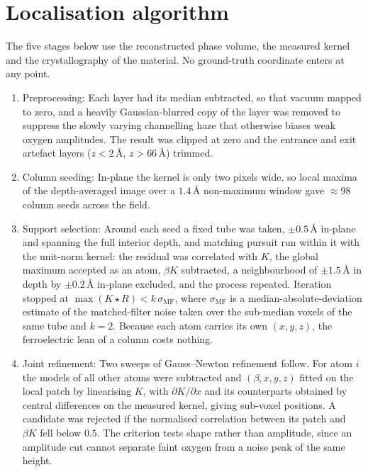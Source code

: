 \documentclass[aps,prb,twocolumn,superscriptaddress,floatfix,nofootinbib]{revtex4-2}
\begin{document}
\section{Localisation algorithm}
\label{app:algo}
\setcounter{table}{0}
\setcounter{figure}{0}

The five stages below use the reconstructed phase volume, the measured kernel and the crystallography of the material. No ground-truth coordinate enters at any point.

\begin{enumerate}
\setlength{\itemsep}{2pt}
\item Preprocessing: Each layer had its median subtracted, so that vacuum mapped to zero, and a heavily Gaussian-blurred copy of the layer was removed to suppress the slowly varying channelling haze that otherwise biases weak oxygen amplitudes. The result was clipped at zero and the entrance and exit artefact layers ($z<2$\,\AA, $z>66$\,\AA) trimmed.

\item Column seeding: In-plane the kernel is only two pixels wide, so local maxima of the depth-averaged image over a $1.4$\,\AA{} non-maximum window gave $\approx98$ column seeds across the field.

\item Support selection: Around each seed a fixed tube was taken, $\pm0.5$\,\AA{} in-plane and spanning the full interior depth, and matching pursuit run within it with the unit-norm kernel: the residual was correlated with $K$, the global maximum accepted as an atom, $\beta K$ subtracted, a neighbourhood of $\pm1.5$\,\AA{} in depth by $\pm0.2$\,\AA{} in-plane excluded, and the process repeated. Iteration stopped at $\max(K\star R)<k\,\sigma_{\mathrm{MF}}$, where $\sigma_{\mathrm{MF}}$ is a median-absolute-deviation estimate of the matched-filter noise taken over the sub-median voxels of the same tube and $k=2$. Because each atom carries its own $(x,y,z)$, the ferroelectric lean of a column costs nothing.

\item Joint refinement: Two sweeps of Gauss--Newton refinement follow. For atom $i$ the models of all other atoms were subtracted and $(\beta,x,y,z)$ fitted on the local patch by linearising $K$, with $\partial K/\partial x$ and its counterparts obtained by central differences on the measured kernel, giving sub-voxel positions. A candidate was rejected if the normalised correlation between its patch and $\beta K$ fell below $0.5$. The criterion tests shape rather than amplitude, since an amplitude cut cannot separate faint oxygen from a noise peak of the same height.


\end{enumerate}
\end{document}
